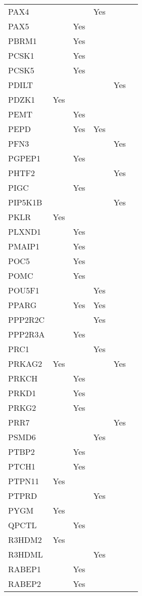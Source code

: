 \documentclass[twoside,openright]{report}
\begin{document}
\begin{appendices}
\begin{longtable}[t]{llllll}
PAX4 &  &  & Yes &  & \\
PAX5 &  & Yes &  &  & \\
PBRM1 &  & Yes &  &  & \\
PCSK1 &  & Yes &  &  & \\
PCSK5 &  & Yes &  &  & \\
PDILT &  &  &  & Yes & \\
PDZK1 & Yes &  &  &  & \\
PEMT &  & Yes &  &  & \\
PEPD &  & Yes & Yes &  & \\
PFN3 &  &  &  & Yes & \\
PGPEP1 &  & Yes &  &  & \\
PHTF2 &  &  &  & Yes & \\
PIGC &  & Yes &  &  & \\
PIP5K1B &  &  &  & Yes & \\
PKLR & Yes &  &  &  & \\
PLXND1 &  & Yes &  &  & \\
PMAIP1 &  & Yes &  &  & \\
POC5 &  & Yes &  &  & \\
POMC &  & Yes &  &  & \\
POU5F1 &  &  & Yes &  & \\
PPARG &  & Yes & Yes &  & \\
PPP2R2C &  &  & Yes &  & \\
PPP2R3A &  & Yes &  &  & \\
PRC1 &  &  & Yes &  & \\
PRKAG2 & Yes &  &  & Yes & \\
PRKCH &  & Yes &  &  & \\
PRKD1 &  & Yes &  &  & \\
PRKG2 &  & Yes &  &  & \\
PRR7 &  &  &  & Yes & \\
PSMD6 &  &  & Yes &  & \\
PTBP2 &  & Yes &  &  & \\
PTCH1 &  & Yes &  &  & \\
PTPN11 & Yes &  &  &  & \\
PTPRD &  &  & Yes &  & \\
PYGM & Yes &  &  &  & \\
QPCTL &  & Yes &  &  & \\
R3HDM2 & Yes &  &  &  & \\
R3HDML &  &  & Yes &  & \\
RABEP1 &  & Yes &  &  & \\
RABEP2 &  & Yes &  &  & \\

\end{longtable}
\end{appendices}
\end{document}
